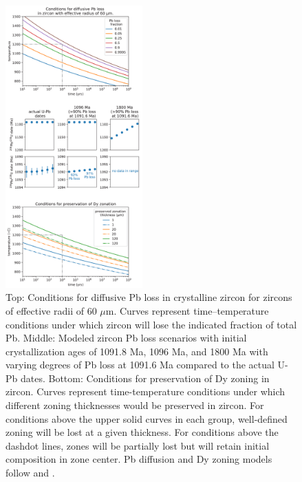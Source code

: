 \begin{figure}[h!]
\noindent\includegraphics[width=0.47\textwidth]{figure/Zhang2021/diffusive_loss.pdf}
\centering
\caption[Zircon diffusion modeling]{\footnotesize{Top: Conditions for diffusive Pb loss in crystalline zircon for zircons of effective radii of 60 $\mu$m. Curves represent time--temperature conditions under which zircon will lose the indicated fraction of total Pb. Middle: Modeled zircon Pb loss scenarios with initial crystallization ages of 1091.8 Ma, 1096 Ma, and 1800 Ma with varying degrees of Pb loss at 1091.6 Ma compared to the actual U-Pb dates. Bottom: Conditions for preservation of Dy zoning in zircon. Curves represent time-temperature conditions under which different zoning thicknesses would be preserved in zircon. For conditions above the upper solid curves in each group, well-defined zoning will be lost at a given thickness. For conditions above the dashdot lines, zones will be partially lost but will retain initial composition in zone center. Pb diffusion and Dy zoning models follow \cite{Cherniak2001a} and \cite{Cherniak1997a}.}}
\label{fig:diffusive_loss}
\end{figure}

